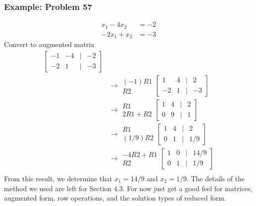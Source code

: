 \documentclass[14pt]{extarticle}
\begin{document}
\subsubsection*{Example: Problem 57}
\begin{align*}
	x_1 - 4x_2 &= -2 \\
	-2x_1 + x_2 &= -3
\end{align*}
Convert to augmented matrix
\begin{align*}
	\begin{bmatrix}
		-1 & -4 & | & -2\\
		-2 & 1 & | & -3
	\end{bmatrix} \\
	&\to 
	\begin{array}{r}
		(-1)R1 \\
		R2
	\end{array}
	\begin{bmatrix}
		1 & 4 & | & 2\\
		-2 & 1 & | & -3
	\end{bmatrix} \\
	&\to 
	\begin{array}{r}
		R1 \\
		2R1+R2
	\end{array}
	\begin{bmatrix}
		1 & 4 & | & 2\\
		0 & 9 & | & 1
	\end{bmatrix} \\
	&\to 
	\begin{array}{r}
		R1 \\
		(1/9)R2
	\end{array}
	\begin{bmatrix}
		1 & 4 & | & 2\\
		0 & 1 & | & 1/9
	\end{bmatrix} \\
	&\to 
	\begin{array}{r}
		-4R2 + R1 \\
		R2
	\end{array}
	\begin{bmatrix}
		1 & 0 & | & 14/9\\
		0 & 1 & | & 1/9
	\end{bmatrix} \\
\end{align*}
From this result, we determine that $x_1=14/9$ and $x_2 = 1/9$. The details of the method we used are left for Section 4.3. For now just get a good feel for matrices, augmented form, row operations, and the solution types of reduced form.
\end{document}
